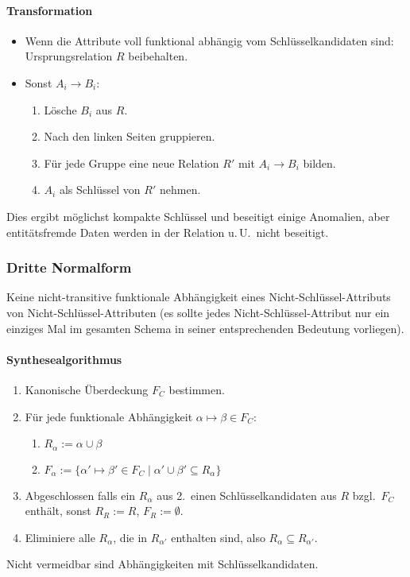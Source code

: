 \paragraph*{Transformation}
\begin{itemize}
\item Wenn die Attribute voll funktional abhängig vom Schlüsselkandidaten
sind: Ursprungsrelation $R$ beibehalten.
\item Sonst $A_{i}\to B_{i}$:

\begin{enumerate}
\item Lösche $B_{i}$ aus $R$.
\item Nach den linken Seiten gruppieren.
\item Für jede Gruppe eine neue Relation $R'$ mit $A_{i}\to B_{i}$ bilden.
\item $A_{i}$ als Schlüssel von $R'$ nehmen.
\end{enumerate}
\end{itemize}
Dies ergibt möglichst kompakte Schlüssel und beseitigt einige Anomalien,
aber entitätsfremde Daten werden in der Relation u.\,U.~nicht beseitigt.


\subsubsection{Dritte Normalform}

Keine nicht-transitive funktionale Abhängigkeit eines Nicht-Schlüssel-Attributs
von Nicht-Schlüssel-Attributen (es sollte jedes Nicht-Schlüssel-Attribut
nur ein einziges Mal im gesamten Schema in seiner entsprechenden Bedeutung
vorliegen).


\paragraph*{Synthesealgorithmus}
\begin{enumerate}
\item Kanonische Überdeckung $F_C$ bestimmen.
\item Für jede funktionale Abhängigkeit $\alpha\mapsto\beta\in F_{C}$:

\begin{enumerate}
\item $R_{\alpha}:=\alpha\cup\beta$
\item $F_{\alpha}:=\{ \alpha'\mapsto\beta'\in F_{C}\mid\alpha'\cup\beta'\subseteq R_{\alpha}\} $
\end{enumerate}
\item Abgeschlossen falls ein $R_{\alpha}$ aus 2.~einen Schlüsselkandidaten
aus $R$ bzgl.~$F_{C}$ enthält, sonst $R_{R}:=R$, $F_{R}:=\emptyset$.
\item Eliminiere alle $R_{\alpha}$, die in $R_{\alpha'}$ enthalten sind,
also $R_{\alpha}\subseteq R_{\alpha'}$.
\end{enumerate}
Nicht vermeidbar sind Abhängigkeiten mit Schlüsselkandidaten.


